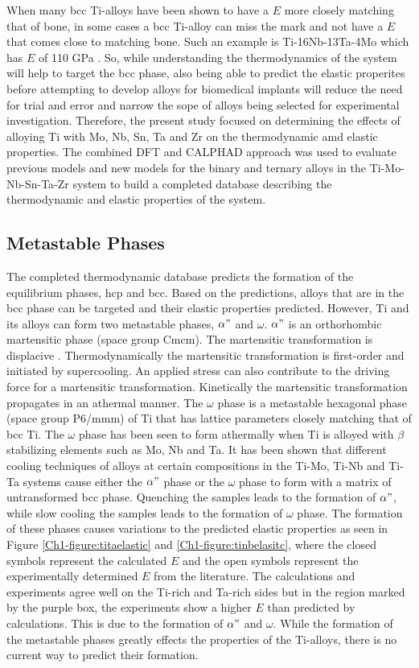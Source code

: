 When many bcc Ti-alloys have been shown to have a $E$ more closely matching that of bone, in some cases a bcc Ti-alloy can miss the mark and not have a $E$ that comes close to matching bone. Such an example is Ti-16Nb-13Ta-4Mo which has $E$ of 110 GPa \cite{Geetha2009}. So, while understanding the thermodynamics of the system will help to target the bcc phase, also being able to predict the elastic properites before attempting to develop alloys for biomedical implants will reduce the need for trial and error and narrow the sope of alloys being selected for experimental investigation. Therefore, the present study focused on determining the effects of alloying Ti with Mo, Nb, Sn, Ta and Zr on the thermodynamic amd elastic properties. The combined DFT and CALPHAD approach was used to evaluate previous models and new models for the binary and ternary alloys in the Ti-Mo-Nb-Sn-Ta-Zr system to build a completed database describing the thermodynamic and elastic properties of the system.

\subsection{Metastable Phases}

The completed thermodynamic database predicts the formation of the equilibrium phases, hcp and bcc. Based on the predictions, alloys that are in the bcc phase can be targeted and their elastic properties predicted. However, Ti and its alloys can form two metastable phases, $\alpha"$ and $\omega$. $\alpha"$ is an orthorhombic martensitic phase (space group Cmcm). The martensitic transformation is displacive \cite{Khachaturyan1985,Salje1990}. Thermodynamically the martensitic transformation is first-order and initiated by supercooling. An applied stress can also contribute to the driving force for a martensitic transformation. Kinetically the martensitic transformation propagates in an athermal manner. The $\omega$ phase is a metastable hexagonal phase (space group P6/mmm) of Ti that has lattice parameters closely matching that of bcc Ti. The $\omega$ phase has been seen to form athermally when Ti is alloyed with $\beta$ stabilizing elements such as Mo, Nb and Ta. It has been shown that different cooling techniques of alloys at certain compositions in the Ti-Mo, Ti-Nb and Ti-Ta systems cause either the $\alpha"$ phase or the $\omega$ phase to form with a matrix of untransformed bcc phase. Quenching the samples leads to the formation of $\alpha"$, while slow cooling the samples leads to the formation of $\omega$ phase. The formation of these phases causes variations to the predicted elastic properties as seen in Figure \ref{Ch1-figure:titaelastic} and \ref{Ch1-figure:tinbelasitc}, where the closed symbols represent the calculated $E$ and the open symbols represent the experimentally determined $E$ from the literature. The calculations and experiments agree well on the Ti-rich and Ta-rich sides but in the region marked by the purple box, the experiments show a higher $E$ than predicted by calculations. This is due to the formation of $\alpha"$ and $\omega$. While the formation of the metastable phases greatly effects the properties of the Ti-alloys, there is no current way to predict their formation. 

